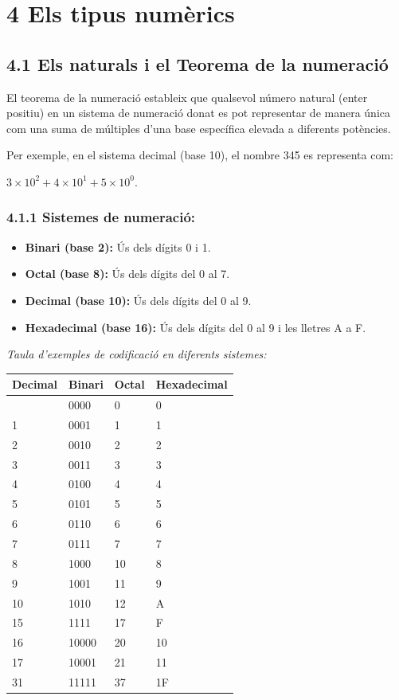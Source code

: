 \documentclass[
  12 pt,
  a4paper,
]{article}
\providecommand{\tightlist}{%
  \setlength{\itemsep}{0pt}\setlength{\parskip}{0pt}}
\begin{document}
\section{4 Els tipus numèrics}\label{els-tipus-numuxe8rics}

\subsection{4.1 Els naturals i el Teorema de la
numeració}\label{els-naturals-i-el-teorema-de-la-numeraciuxf3}

El teorema de la numeració estableix que qualsevol número natural (enter
positiu) en un sistema de numeració donat es pot representar de manera
única com una suma de múltiples d'una base específica elevada a
diferents potències.

Per exemple, en el sistema decimal (base 10), el nombre 345 es
representa com:

\(3 \times 10^2 + 4 \times 10^1 + 5 \times 10^0\).

\subsubsection{4.1.1 Sistemes de
numeració:}\label{sistemes-de-numeraciuxf3}

\begin{itemize}
\tightlist
\item
  \textbf{Binari (base 2):} Ús dels dígits 0 i 1.
\item
  \textbf{Octal (base 8):} Ús dels dígits del 0 al 7.
\item
  \textbf{Decimal (base 10):} Ús dels dígits del 0 al 9.
\item
  \textbf{Hexadecimal (base 16):} Ús dels dígits del 0 al 9 i les
  lletres A a F.
\end{itemize}

\emph{Taula d'exemples de codificació en diferents sistemes:}

\begin{longtable}[]{@{}llll@{}}
\toprule\noalign{}
Decimal & Binari & Octal & Hexadecimal \\
\midrule\noalign{}
\endhead
\bottomrule\noalign{}
\endlastfoot
0 & 0000 & 0 & 0 \\
1 & 0001 & 1 & 1 \\
2 & 0010 & 2 & 2 \\
3 & 0011 & 3 & 3 \\
4 & 0100 & 4 & 4 \\
5 & 0101 & 5 & 5 \\
6 & 0110 & 6 & 6 \\
7 & 0111 & 7 & 7 \\
8 & 1000 & 10 & 8 \\
9 & 1001 & 11 & 9 \\
10 & 1010 & 12 & A \\
15 & 1111 & 17 & F \\
16 & 10000 & 20 & 10 \\
17 & 10001 & 21 & 11 \\
31 & 11111 & 37 & 1F \\
\end{longtable}
\end{document}
